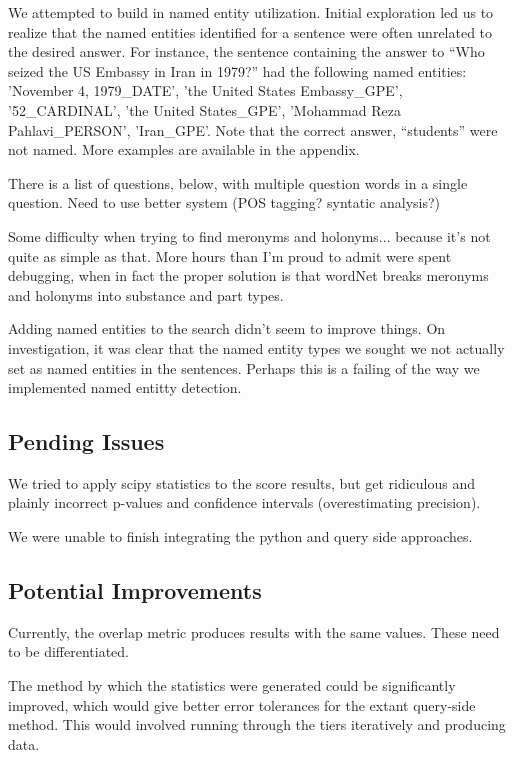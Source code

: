 \documentclass[11pt]{article}
\begin{document}
We attempted to build in named entity utilization. Initial exploration led us to realize that the named entities identified for a sentence were often unrelated to the desired answer. For instance, the sentence containing the answer to ``Who seized the US Embassy in Iran in 1979?'' had the following named entities: 'November 4, 1979\_DATE', 'the United States Embassy\_GPE', '52\_CARDINAL', 'the United States\_GPE', 'Mohammad Reza Pahlavi\_PERSON', 'Iran\_GPE'. Note that the correct answer, ``students'' were not named. More examples are available in the appendix.


There is a list of questions, below, with multiple question words in a single question. Need to use better system (POS tagging? syntatic analysis?)

Some difficulty when trying to find meronyms and holonyms... because it's not quite as simple as that. More hours than I'm proud to admit were spent debugging, when in fact the proper solution is that wordNet breaks meronyms and holonyms into substance and part types.

Adding named entities to the search didn't seem to improve things. On investigation, it was clear that the named entity types we sought we not actually set as named entities in the sentences. Perhaps this is a failing of the way we implemented named entitty detection.

\subsection{Pending Issues}

We tried to apply scipy statistics to the score results, but get ridiculous and plainly incorrect p-values and confidence intervals (overestimating precision).

We were unable to finish integrating the python and query side approaches.

\subsection{Potential Improvements}

Currently, the overlap metric produces results with the same values. These need to be differentiated.

The method by which the statistics were generated could be significantly improved, which would give better error tolerances for the extant query-side method. This would involved running through the tiers iteratively and producing data.
\end{document}
